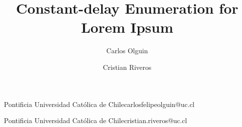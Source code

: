 

\title{Constant-delay Enumeration for Lorem Ipsum} 


\author{Carlos Olguin}{Pontificia Universidad Católica de Chile}{carlosfelipeolguin@uc.cl}{}{}
\author{Cristian Riveros}{Pontificia Universidad Católica de Chile}{cristian.riveros@uc.cl}{}{}







\hideLIPIcs  %


